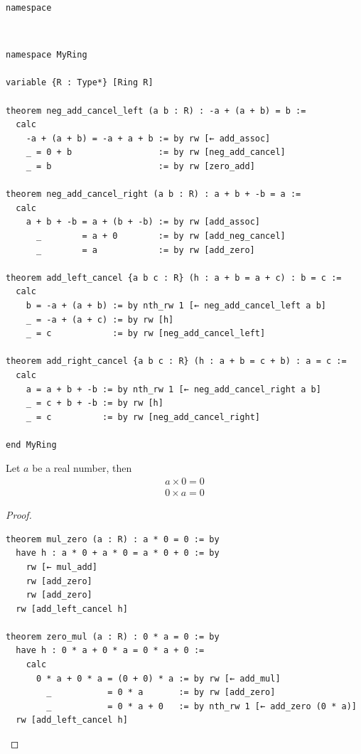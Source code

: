 \documentclass{blog}
\begin{document}
\begin{definition}[namespace]
  \verb|namespace|
\end{definition}

\begin{example}~
  \begin{verbatim}
namespace MyRing

variable {R : Type*} [Ring R]

theorem neg_add_cancel_left (a b : R) : -a + (a + b) = b :=
  calc
    -a + (a + b) = -a + a + b := by rw [← add_assoc]
    _ = 0 + b                 := by rw [neg_add_cancel]
    _ = b                     := by rw [zero_add]

theorem neg_add_cancel_right (a b : R) : a + b + -b = a :=
  calc
    a + b + -b = a + (b + -b) := by rw [add_assoc]
      _        = a + 0        := by rw [add_neg_cancel]
      _        = a            := by rw [add_zero]

theorem add_left_cancel {a b c : R} (h : a + b = a + c) : b = c :=
  calc
    b = -a + (a + b) := by nth_rw 1 [← neg_add_cancel_left a b]
    _ = -a + (a + c) := by rw [h]
    _ = c            := by rw [neg_add_cancel_left]

theorem add_right_cancel {a b c : R} (h : a + b = c + b) : a = c :=
  calc
    a = a + b + -b := by nth_rw 1 [← neg_add_cancel_right a b]
    _ = c + b + -b := by rw [h]
    _ = c          := by rw [neg_add_cancel_right]

end MyRing
\end{verbatim}
\end{example}

\begin{proposition}
  Let $a$ be a real number, then
  \begin{gather*}
    a \times 0 = 0 \\
    0 \times a = 0
  \end{gather*}
\end{proposition}

\begin{proof}~
  \begin{verbatim}
theorem mul_zero (a : R) : a * 0 = 0 := by
  have h : a * 0 + a * 0 = a * 0 + 0 := by
    rw [← mul_add]
    rw [add_zero]
    rw [add_zero]
  rw [add_left_cancel h]

theorem zero_mul (a : R) : 0 * a = 0 := by
  have h : 0 * a + 0 * a = 0 * a + 0 :=
    calc
      0 * a + 0 * a = (0 + 0) * a := by rw [← add_mul]
        _           = 0 * a       := by rw [add_zero]
        _           = 0 * a + 0   := by nth_rw 1 [← add_zero (0 * a)]
  rw [add_left_cancel h]
\end{verbatim}
\end{proof}
\end{document}
